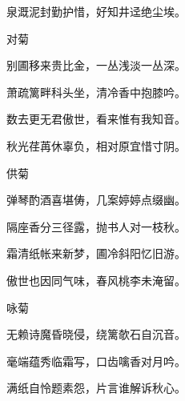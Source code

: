 \begin{poem}
    \begin{pl}泉溉泥封勤护惜，好知井迳绝尘埃。\end{pl}
    \emptypl

    \begin{pl}对菊　\end{pl}

    \begin{pl}别圃移来贵比金，一丛浅淡一丛深。\end{pl}

    \begin{pl}萧疏篱畔科头坐，清冷香中抱膝吟。\end{pl}

    \begin{pl}数去更无君傲世，看来惟有我知音。\end{pl}

    \begin{pl}秋光荏苒休辜负，相对原宜惜寸阴。\end{pl}
    \emptypl

    \begin{pl}供菊　\end{pl}

    \begin{pl}弹琴酌酒喜堪俦，几案婷婷点缀幽。\end{pl}

    \begin{pl}隔座香分三径露，抛书人对一枝秋。\end{pl}

    \begin{pl}霜清纸帐来新梦，圃冷斜阳忆旧游。\end{pl}

    \begin{pl}傲世也因同气味，春风桃李未淹留。\end{pl}
    \emptypl

    \begin{pl}咏菊　\end{pl}

    \begin{pl}无赖诗魔昏晓侵，绕篱欹石自沉音。\end{pl}

    \begin{pl}毫端蕴秀临霜写，口齿噙香对月吟。\end{pl}

    \begin{pl}满纸自怜题素怨，片言谁解诉秋心。\end{pl}


\end{poem}
